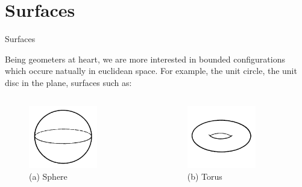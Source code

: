 \documentclass{beamer}
\begin{document}
\section{Surfaces}

\begin{frame}{Surfaces}
  \begin{block}{}
    Being geometers at heart, we are more interested in bounded configurations which occure natually in euclidean space. For example, the unit circle, the unit disc in the plane, surfaces such as:
  \end{block}
  \begin{columns}
    \begin{column}{0.5\textwidth}
      \begin{figure}
        \centering
        \includegraphics[width=0.7\textwidth]{figure_1_10_a.png}
        \caption{(a) Sphere}
      \end{figure}
    \end{column}
    \begin{column}{0.5\textwidth}
      \begin{figure}
        \centering
        \includegraphics[width=0.7\textwidth]{figure_1_10_b.png}
        \caption{(b) Torus}
      \end{figure}
    \end{column}
  \end{columns}
\end{frame}
\end{document}
